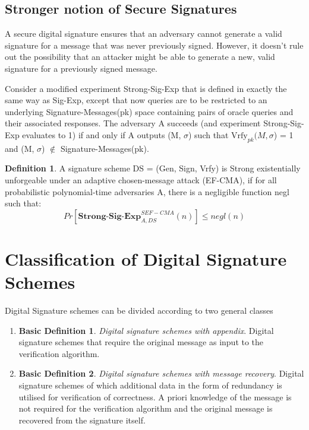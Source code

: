 \documentclass[]{final_report}
\theoremstyle{definition}
\newtheorem{definition}{Definition}[chapter]
\newtheorem{basic}{Basic Definition}
\begin{document}
\subsection{Stronger notion of Secure Signatures}
A secure digital signature ensures that an adversary cannot generate a valid signature for a message that was never previously signed. However, it doesn't rule out the possibility that an attacker might be able to generate a new, valid signature for a previously signed message.

Consider a modified experiment Strong-Sig-Exp that is defined in exactly the same way as Sig-Exp, except that now queries are to be restricted to an underlying Signature-Messages(pk) space containing pairs of oracle queries and their associated responses.  The adversary A succeeds (and experiment Strong-Sig-Exp evaluates to 1) if and only if A outputs (M, $\sigma$) such that $\text{Vrfy}_{pk} (M, \sigma$) = 1 and (M, $\sigma$) $\notin$ Signature-Messages(pk).
 \begin{definition}
A signature scheme DS = (Gen, Sign, Vrfy) is Strong existentially unforgeable under an adaptive chosen-message attack (EF-CMA), if for all probabilistic polynomial-time adversaries A, there is a negligible function negl such that:
\[ Pr[\textbf{Strong-Sig-Exp}_{A,DS}^{SEF-CMA}(n)] \leq negl(n) \]

\end{definition}



\section{Classification of Digital Signature Schemes}
Digital Signature schemes can be divided according to two general classes
\begin{enumerate}
    \item \begin{basic} 
\textit{Digital signature schemes with appendix}. Digital signature schemes that require the original message as input to the verification algorithm.
\end{basic}
    \item \begin{basic}
\textit{Digital signature schemes with message recovery}. Digital signature schemes of which additional data in the form of redundancy is utilised for verification of correctness. A priori knowledge of the message is not required for the verification algorithm and the original message is recovered from the signature itself.
\end{basic}

\end{enumerate}
\end{document}
